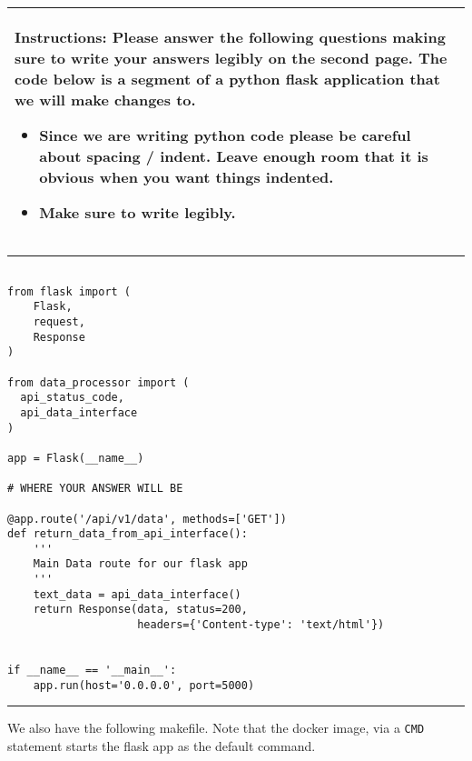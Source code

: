\documentclass[11pt]{article}
\begin{document}

\begin{table}[h]
\centering
{} %
\begin{tabular}{|p{\textwidth}|}
\hline
\begin{minipage}[t]{\textwidth}
\vspace{0pt}  %
\noindent \textbf{Instructions:} Please answer the following questions making sure to write your answers legibly on the second page. The code below is a segment of a python flask application that we will make changes to.
\begin{itemize}
\item Since we are writing python code please be careful about spacing / indent. Leave enough room that it is obvious when you want things indented. 
\item Make sure to write legibly.
\end{itemize}
\end{minipage} 
\\
\hline
\end{tabular}
\end{table}

{\color{lightgray}\hrule}
\begin{verbatim}
	
from flask import (
    Flask,
    request,
    Response
)

from data_processor import (
  api_status_code,
  api_data_interface
)

app = Flask(__name__)

# WHERE YOUR ANSWER WILL BE

@app.route('/api/v1/data', methods=['GET'])
def return_data_from_api_interface():
    '''
    Main Data route for our flask app
    '''
    text_data = api_data_interface()
    return Response(data, status=200,
                    headers={'Content-type': 'text/html'})


if __name__ == '__main__':
    app.run(host='0.0.0.0', port=5000)
\end{verbatim}
{\color{lightgray}\hrule}

\vspace{1cm}
\noindent We also have the following makefile. Note that the docker image, via a \texttt{CMD} statement starts the flask app as the default command.
\end{document}
